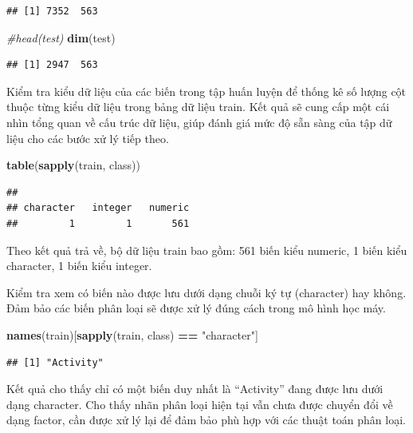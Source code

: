 \documentclass[
]{article}
\newenvironment{Shaded}{\begin{snugshade}}{\end{snugshade}}
\newcommand{\CommentTok}[1]{\textcolor[rgb]{0.56,0.35,0.01}{\textit{#1}}}
\newcommand{\FunctionTok}[1]{\textcolor[rgb]{0.13,0.29,0.53}{\textbf{#1}}}
\newcommand{\NormalTok}[1]{#1}
\newcommand{\SpecialCharTok}[1]{\textcolor[rgb]{0.81,0.36,0.00}{\textbf{#1}}}
\newcommand{\StringTok}[1]{\textcolor[rgb]{0.31,0.60,0.02}{#1}}
\begin{document}
\begin{verbatim}
## [1] 7352  563
\end{verbatim}

\begin{Shaded}
\begin{Highlighting}[]
\CommentTok{\#head(test)}
\FunctionTok{dim}\NormalTok{(test)}
\end{Highlighting}
\end{Shaded}

\begin{verbatim}
## [1] 2947  563
\end{verbatim}

Kiểm tra kiểu dữ liệu của các biến trong tập huấn luyện để thống kê số
lượng cột thuộc từng kiểu dữ liệu trong bảng dữ liệu train. Kết quả sẽ
cung cấp một cái nhìn tổng quan về cấu trúc dữ liệu, giúp đánh giá mức
độ sẵn sàng của tập dữ liệu cho các bước xử lý tiếp theo.

\begin{Shaded}
\begin{Highlighting}[]
\FunctionTok{table}\NormalTok{(}\FunctionTok{sapply}\NormalTok{(train, class))}
\end{Highlighting}
\end{Shaded}

\begin{verbatim}
## 
## character   integer   numeric 
##         1         1       561
\end{verbatim}

Theo kết quả trả về, bộ dữ liệu train bao gồm: 561 biến kiểu numeric, 1
biến kiểu character, 1 biến kiểu integer.

Kiểm tra xem có biến nào được lưu dưới dạng chuỗi ký tự (character) hay
không. Đảm bảo các biến phân loại sẽ được xử lý đúng cách trong mô hình
học máy.

\begin{Shaded}
\begin{Highlighting}[]
\FunctionTok{names}\NormalTok{(train)[}\FunctionTok{sapply}\NormalTok{(train, class) }\SpecialCharTok{==} \StringTok{"character"}\NormalTok{]}
\end{Highlighting}
\end{Shaded}

\begin{verbatim}
## [1] "Activity"
\end{verbatim}

Kết quả cho thấy chỉ có một biến duy nhất là ``Activity'' đang được lưu
dưới dạng character. Cho thấy nhãn phân loại hiện tại vẫn chưa được
chuyển đổi về dạng factor, cần được xử lý lại để đảm bảo phù hợp với các
thuật toán phân loại.
\end{document}
